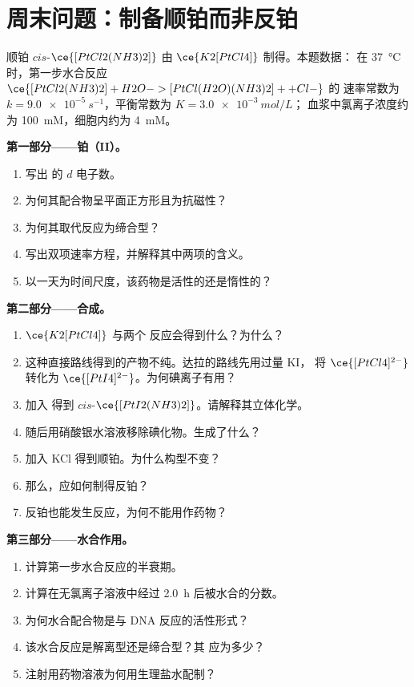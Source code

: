 \section{周末问题：制备顺铂而非反铂}

\begin{problem}
\label{pb:b3:complex-mechanisms:1}
顺铂 $cis$-$\ce{[PtCl2(NH3)2]}$ 由 $\ce{K2[PtCl4]}$ 制得。本题数据：
在 \qty{37}{\celsius} 时，第一步水合反应 $\ce{[PtCl2(NH3)2] + H2O -> [PtCl(H2O)(NH3)2]+ + Cl-}$ 的
速率常数为 $k = \qty{9.0e-5}{s^{-1}}$，平衡常数为 $K = \qty{3.0e-3}{mol/L}$；
血浆中氯离子浓度约为 \qty{100}{mM}，细胞内约为 \qty{4}{mM}。

\medskip\noindent\textbf{第一部分——铂（II）。}
\begin{enumerate}
  \item 写出  的 $d$ 电子数。
  \item 为何其配合物呈平面正方形且为抗磁性？
  \item 为何其取代反应为缔合型？
  \item 写出双项速率方程，并解释其中两项的含义。
  \item 以一天为时间尺度，该药物是活性的还是惰性的？
\end{enumerate}

\medskip\noindent\textbf{第二部分——合成。}
\begin{enumerate}[resume]
  \item $\ce{K2[PtCl4]}$ 与两个  反应会得到什么？为什么？
  \item 这种直接路线得到的产物不纯。达拉的路线先用过量 KI，
        将 $\ce{[PtCl4]^{2-}}$ 转化为 $\ce{[PtI4]^{2-}}$。为何碘离子有用？
  \item 加入  得到 $cis$-$\ce{[PtI2(NH3)2]}$。请解释其立体化学。
  \item 随后用硝酸银水溶液移除碘化物。生成了什么？
  \item 加入 KCl 得到顺铂。为什么构型不变？
  \item 那么，应如何制得反铂？
  \item 反铂也能发生反应，为何不能用作药物？
\end{enumerate}

\medskip\noindent\textbf{第三部分——水合作用。}
\begin{enumerate}[resume]
  \item 计算第一步水合反应的半衰期。
  \item 计算在无氯离子溶液中经过 \qty{2.0}{h} 后被水合的分数。
  \item 为何水合配合物是与 DNA 反应的活性形式？
  \item 该水合反应是解离型还是缔合型？其
        应为多少？
  \item 注射用药物溶液为何用生理盐水配制？
\end{enumerate}


\end{problem}
